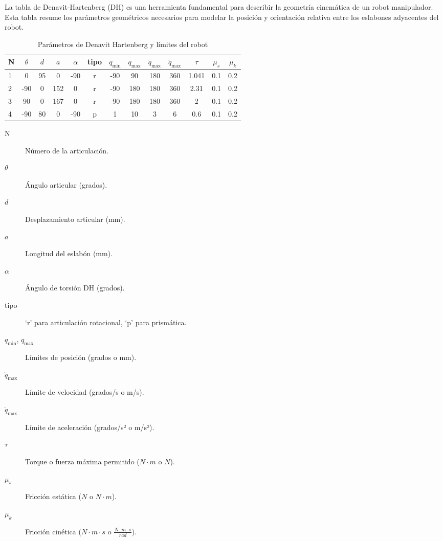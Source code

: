 	La tabla de Denavit-Hartenberg (DH) es una herramienta fundamental para describir la geometría cinemática de un robot manipulador. Esta tabla resume los parámetros geométricos necesarios para modelar la posición y orientación relativa entre los eslabones adyacentes del robot.
\begin{table}[ht]

	\centering
	\caption{Parámetros de Denavit Hartenberg y límites del robot}
	\label{tab:parametros_robot}
	\begin{tabular}{ l|cccccccccccc
		}
		\toprule
		N & {$\theta$} & {$d$} & {$a$} & {$\alpha$} & {tipo} 
		& {$q_{\min}$} & {$q_{\max}$} 
		& {$\dot q_{\max}$} & {$\ddot q_{\max}$} 
		& {$\tau$} & {$\mu_s$} & {$\mu_k$} \\
		\midrule
		1 & 0 & 95 & 0  & -90   & r & -90 & 90 & 180 & 360 &  1.041  & 0.1 & 0.2 \\
		2 & -90 & 0 & 152  & 0 & r & -90 & 180 & 180 & 360 & 2.31  & 0.1 & 0.2 \\
		3 & 90 & 0 & 167  & 0 & r & -90 & 180 & 180 & 360 & 2  & 0.1 & 0.2 \\
		4 & -90 & 80 & 0  & -90   & p &   1 &  10 &   3 &   6 & 0.6  & 0.1 & 0.2 \\
		\bottomrule
	\end{tabular}
\end{table}
\bigskip
\noindent
\begin{description}
	\item[N] Número de la articulación.
	\item[\(\theta\)] Ángulo articular (grados).
	\item[\(d\)] Desplazamiento articular (mm).
	\item[\(a\)] Longitud del eslabón (mm).
	\item[\(\alpha\)] Ángulo de torsión DH (grados).
	\item[tipo] ‘r’ para articulación rotacional, ‘p’ para prismática.
	\item[\(q_{\min}\), \(q_{\max}\)] Límites de posición (grados o mm).
	\item[\(\dot q_{\max}\)] Límite de velocidad (grados/s o m/s).
	\item[\(\ddot q_{\max}\)] Límite de aceleración (grados/s² o m/s²).
	\item[\(\tau\)] Torque o fuerza máxima permitido (\(N \cdot m\) o \(N\)).
	\item[\(\mu_s\)] Fricción estática (\(N\) o \(N \cdot m\)).
	\item[\(\mu_k\)] Fricción cinética (\(N \cdot m \cdot s\) o \(\frac{N \cdot m \cdot s}{rad}\)).
\end{description}

